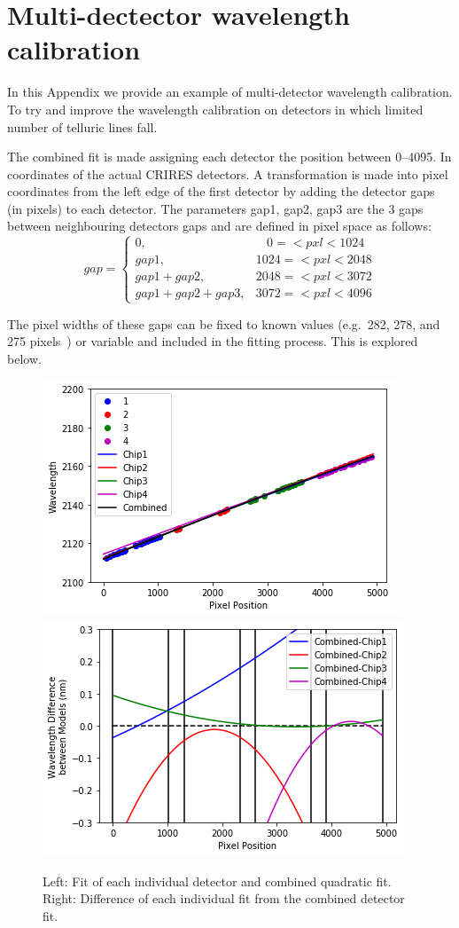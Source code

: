 
\chapter{Multi-dectector wavelength calibration} %
\label{appendix:wavelength_fitting}

In this Appendix we provide an example of multi-detector wavelength calibration. To try and improve the wavelength calibration on detectors in which limited number of telluric lines fall.


The combined fit is made assigning each detector the position between 0--4095. In coordinates of the actual CRIRES detectors. A transformation is made into pixel coordinates from the left edge of the first detector by adding the detector gaps (in pixels) to each detector. The parameters gap1, gap2, gap3 are the 3 gaps between neighbouring detectors gaps and are defined in pixel space as follows:
\[
gap =\begin{cases}
0,                      &~~~~0=<pxl<1024\\
gap1,                   &1024=<pxl<2048\\
gap1 + gap2,            &2048=<pxl<3072\\
gap1 + gap2 + gap3,     &3072=<pxl<4096
\end{cases}
\]

The pixel widths of these gaps can be fixed to known values (e.g.\ 282, 278, and 275 pixels~\citep{brogi_rotation_2016}) or variable and included in the fitting process. This is explored below.




\begin{figure}
    \centering
    \includegraphics[width=0.45\linewidth]{./figures/appendix/multi_detector_fit}
    \includegraphics[width=0.45\linewidth]{./figures/appendix/multidector_fit_diff}
    \caption{Left: Fit of each individual detector and combined quadratic fit. Right: Difference of each individual fit from the combined detector fit.}
    \label{fig:multidectorfitdiff}
\end{figure}


